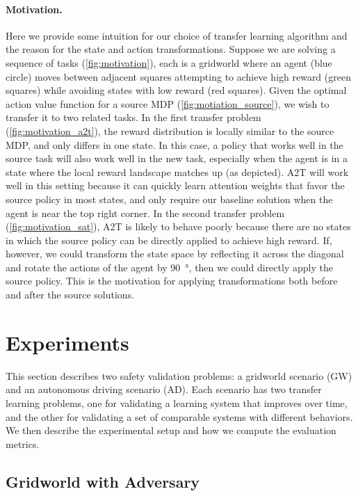 \paragraph{Motivation.} Here we provide some intuition for our choice of transfer learning algorithm and the reason for the state and action transformations. Suppose we are solving a sequence of tasks (\cref{fig:motivation}), each is a gridworld where an agent (blue circle) moves between adjacent squares attempting to achieve high reward (green squares) while avoiding states with low reward (red squares). Given the optimal action value function for a source MDP (\cref{fig:motiation_source}), we wish to transfer it to two related tasks. In the first transfer problem (\cref{fig:motivation_a2t}), the reward distribution is locally similar to the source MDP, and only differs in one state. In this case, a policy that works well in the source task will also work well in the new task, especially when the agent is in a state where the local reward landscape matches up (as depicted). A2T will work well in this setting because it can quickly learn attention weights that favor the source policy in most states, and only require our baseline solution when the agent is near the top right corner. In the second transfer problem (\cref{fig:motivation_sat}), A2T is likely to behave poorly because there are no states in which the source policy can be directly applied to achieve high reward. If, however, we could transform the state space by reflecting it across the diagonal and rotate the actions of the agent by \SI{90}{\degree}, then we could directly apply the source policy. This is the motivation for applying transformations both before and after the source solutions. 


\section{Experiments}

This section describes two safety validation problems: a gridworld scenario (GW) and an autonomous driving scenario (AD). Each scenario has two transfer learning problems, one for validating a learning system that improves over time, and the other for validating a set of comparable systems with different behaviors. We then describe the experimental setup and how we compute the evaluation metrics. 


\subsection{Gridworld with Adversary}

